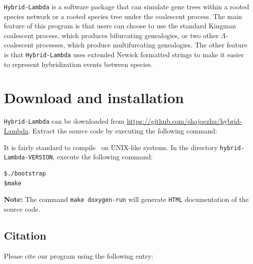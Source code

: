 



{\tt Hybrid-Lambda} is a software package that can simulate gene trees within a rooted species network or a rooted species tree under the coalescent process. The main feature of this program is that users can choose to use the standard Kingman coalescent process, which produces bifurcating genealogies, or two other $\Lambda$-coalescent processes, which produce multifurcating genealogies. The other feature is that {\tt Hybrid-Lambda} uses extended Newick formatted strings to make it easier to represent hybridization events between species.

\vspace{1.5cm}

\begin{center}
%

\end{center}

\vspace{1cm}


\section{Download and installation}
{\tt Hybrid-Lambda} can be downloaded from \url{https://github.com/shajoezhu/hybrid-Lambda}. 
Extract the source code by executing the following command:

It is fairly standard to compile \hs~on UNIX-like systems. In the directory {\tt hybrid-Lambda-VERSION}, execute the following command:
\begin{verbatim}
$./bootstrap
$make
\end{verbatim}

{\bf Note:} The command {\tt make doxygen-run} will generate {\tt HTML} documentation of the source code.

\subsection{Citation}
Please cite our program using the following entry:\\


